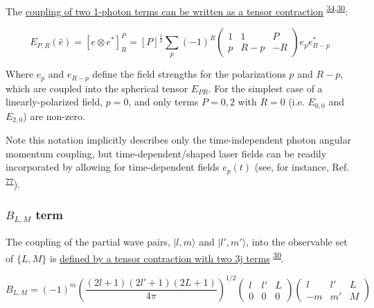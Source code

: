 \documentclass[10pt]{article}
\begin{document}
The
\href{https://epsproc.readthedocs.io/en/latest/methods/geometric_method_dev_260220_090420_tidy.html\#E_\%7BP,R\%7D-tensor}{coupling
of two 1-photon terms can be written as a tensor contraction} \textsuperscript{\hyperref[csl:34]{34},\hyperref[csl:30]{30}}:

\begin{equation}
E_{P,R}(\hat{e})=[e\otimes e^{*}]_{R}^{P}=[P]^{\frac{1}{2}}\sum_{p}(-1)^{R}\left(\begin{array}{ccc}
1 & 1 & P\\
p & R-p & -R
\end{array}\right)e_{p}e_{R-p}^{*}
\label{eq:EPR-defn-1}
\end{equation}

Where \(e_{p}\) and \(e_{R-p}\) define the field strengths for the
polarizations \(p\) and \(R-p\), which are coupled into the spherical
tensor \(E_{PR}\). For the simplest case of a linearly-polarized field, $p=0$, and only terms $P=0,2$ with $R=0$ (i.e. $E_{0,0}$ and $E_{2,0}$) are non-zero.

Note this notation implicitly describes only the time-independent photon angular momentum coupling,
but time-dependent/shaped laser fields can be readily incorporated by allowing for time-dependent fields $e_{p}(t)$ (see, for instance, Ref. \textsuperscript{\hyperref[csl:77]{77}}).

\subsubsection{\texorpdfstring{\(B_{L,M}\)
term}{B\_\{L,M\} term}}\label{b_lm-term}

The coupling of the partial wave pairs, \(|l,m\rangle\) and
\(|l',m'\rangle\), into the observable set of \(\{L,M\}\) is
\href{https://epsproc.readthedocs.io/en/latest/methods/geometric_method_dev_260220_090420_tidy.html\#B_\%7BL,M\%7D-term}{defined
by a tensor contraction with two 3j terms} \textsuperscript{\hyperref[csl:30]{30}}.

\begin{equation}
B_{L,M}=(-1)^{m}\left(\frac{(2l+1)(2l'+1)(2L+1)}{4\pi}\right)^{1/2}\left(\begin{array}{ccc}
l & l' & L\\
0 & 0 & 0
\end{array}\right)\left(\begin{array}{ccc}
l & l' & L\\
-m & m' & M
\end{array}\right)
\label{eq:BLM-func-defn}
\end{equation}
\end{document}
